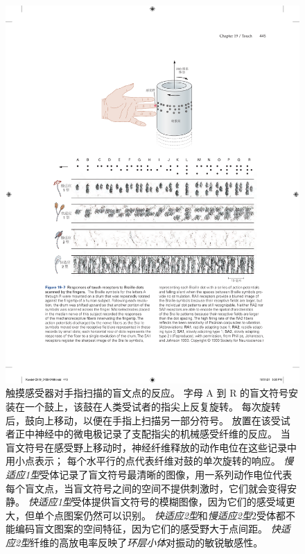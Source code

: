 \begin{figure}[htbp]
	\centering
	\includegraphics[width=1.0\linewidth]{chap19/fig_19_7}
	\caption{触摸感受器对手指扫描的盲文点的反应。
		字母 A 到 R 的盲文符号安装在一个鼓上，该鼓在人类受试者的指尖上反复旋转。
		每次旋转后，鼓向上移动，以便在手指上扫描另一部分符号。
		放置在该受试者正中神经中的微电极记录了支配指尖的机械感受纤维的反应。
		当盲文符号在感受野上移动时，神经纤维释放的动作电位在这些记录中用小点表示； 每个水平行的点代表纤维对鼓的单次旋转的响应。
		\textit{慢适应1型}受体记录了盲文符号最清晰的图像，用一系列动作电位代表每个盲文点，当盲文符号之间的空间不提供刺激时，它们就会变得安静。
		\textit{快适应1型}受体提供盲文符号的模糊图像，因为它们的感受域更大，但单个点图案仍然可以识别。 
		\textit{快适应2型}和\textit{慢适应2型}2受体都不能编码盲文图案的空间特征，因为它们的感受野大于点间距。
		\textit{快适应2型}纤维的高放电率反映了\textit{环层小体}对振动的敏锐敏感性\cite{phillips1990representation}。}
	\label{fig:19_7}
\end{figure}


